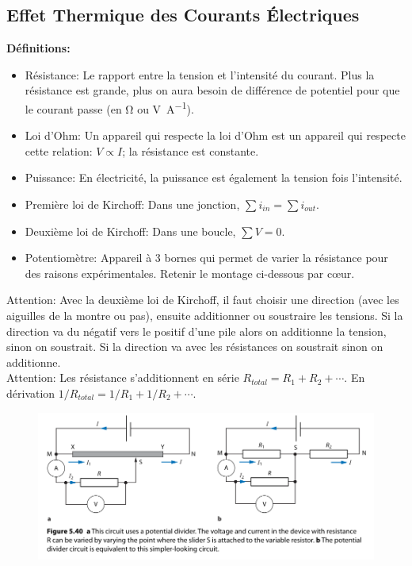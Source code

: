 \documentclass[french, a4paper, 12pt]{article}
\begin{document}
\subsection{Effet Thermique des Courants Électriques}
\textbf{Définitions:}
\begin{itemize}
\item Résistance: Le rapport entre la tension et l'intensité du courant. Plus la résistance est grande, plus on aura besoin de différence de potentiel pour que le courant passe (en \si{\ohm} ou \si{\volt\per\ampere}).
\item Loi d'Ohm: Un appareil qui respecte la loi d'Ohm est un appareil qui respecte cette relation: $V \propto I$; la résistance est constante.
\item Puissance: En électricité, la puissance est également la tension fois l'intensité.
\item Première loi de Kirchoff: Dans une jonction, $\sum i_{in} = \sum i_{out}$.
\item Deuxième loi de Kirchoff: Dans une boucle, $\sum V=0$.
\item Potentiomètre: Appareil à 3 bornes qui permet de varier la résistance pour des raisons expérimentales. Retenir le montage ci-dessous par cœur.
\end{itemize}
Attention: Avec la deuxième loi de Kirchoff, il faut choisir une direction (avec les aiguilles de la montre ou pas), ensuite additionner ou soustraire les tensions. Si la direction va du négatif vers le positif d'une pile alors on additionne la tension, sinon on soustrait. Si la direction va avec les résistances on soustrait sinon on additionne.\\
Attention: Les résistance s'additionnent en série $R_{total}=R_1+R_2+\cdots$. En dérivation $1/R_{total}=1/R_1+1/R_2+\cdots$.
\begin{figure}[h]
\centering
\includegraphics[scale=0.6]{potential_divider}
\end{figure}
\end{document}
